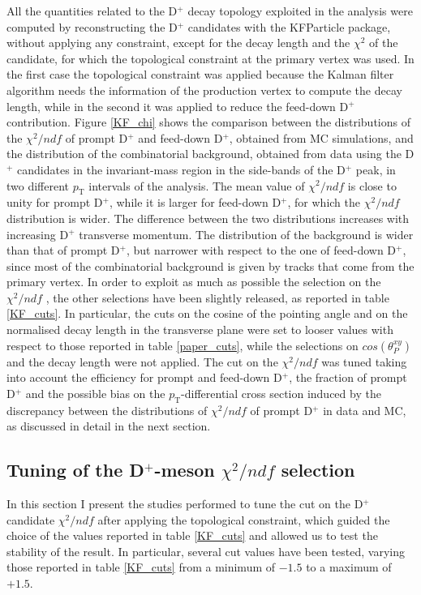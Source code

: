\documentclass[b5paper,10pt,twoside,oldstyle,classica]{toptesi}
\newcommand{\pt}{p_\text{T}}
\begin{document}
All the quantities related to the D$^+$ decay topology exploited in the analysis were computed by reconstructing the D$^+$ candidates with the KFParticle package, without applying any constraint, except for the decay length and the $\chi^2$ of the candidate, for which the topological constraint at the primary vertex was used. In the first case the topological constraint was applied because the Kalman filter algorithm needs the information of the production vertex to compute the decay length, while in the second it was applied to reduce the feed-down D$^+$ contribution. Figure \ref{KF_chi} shows the comparison between the distributions of the $\chi^2/ndf$ of prompt D$^+$ and feed-down D$^+$, obtained from MC simulations, and the distribution of the combinatorial background, obtained from data using the D$^+$ candidates in the invariant-mass region in the side-bands of the D$^+$ peak, in two different $\pt$ intervals of the analysis. The mean value of $\chi^2/ndf$ is close to unity for prompt D$^+$, while it is larger for feed-down D$^+$, for which the $\chi^2/ndf$ distribution is wider. The difference between the two distributions increases with increasing D$^+$ transverse momentum. The distribution of the background is wider than that of prompt D$^+$, but narrower with respect to the one of feed-down D$^+$, since most of the combinatorial background is given by tracks that come from the primary vertex. In order to exploit as much as possible the selection on the $\chi^2/ndf$ , the other selections have been slightly released, as reported in table \ref{KF_cuts}. In particular, the cuts on the cosine of the pointing angle and on the normalised decay length in the transverse plane were set to looser values with respect to those reported in table \ref{paper_cuts}, while the selections on $cos(\theta_P^{xy})$ and the decay length were not applied. The cut on the $\chi^2/ndf$ was tuned taking into account the efficiency for prompt and feed-down D$^+$, the fraction of prompt D$^+$ and the possible bias on the $\pt$-differential cross section induced by the discrepancy between the distributions of $\chi^2/ndf$ of prompt D$^+$ in data and MC, as discussed in detail in the next section.  
\subsection{Tuning of the D$^+$-meson $\chi^2/ndf$ selection}
In this section I present the studies performed to tune the cut on the D$^+$ candidate $\chi^2/ndf$ after applying the topological constraint, which guided the choice of the values reported in table \ref{KF_cuts} and allowed us to test the stability of the result. In particular, several cut values have been tested, varying those reported in table \ref{KF_cuts} from a minimum of $-1.5$ to a maximum of $+1.5$. 
\end{document}
